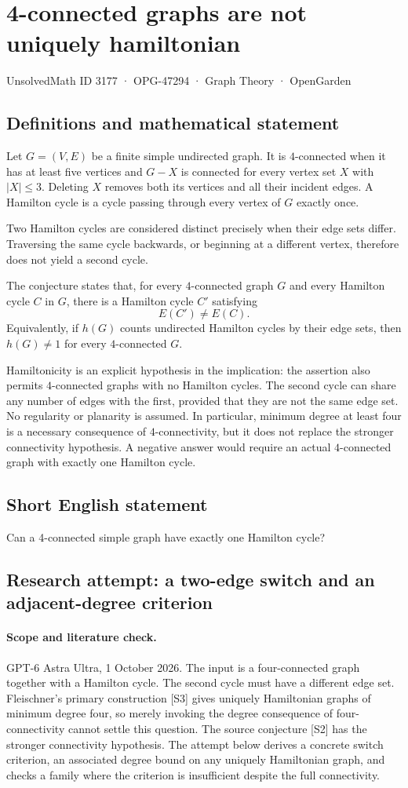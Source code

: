 \documentclass[11pt,a4paper]{article}
\begin{document}
\section*{4-connected graphs are not uniquely hamiltonian}\label{3177}
{\small UnsolvedMath ID 3177 · OPG-47294 · Graph Theory · OpenGarden}
\subsection{Definitions and mathematical statement}
Let $G=(V,E)$ be a finite simple undirected graph.
It is $4$-connected when it has at least five vertices
and $G-X$ is connected for every vertex set $X$ with
$|X|\leq3$. Deleting $X$ removes both its vertices and
all their incident edges. A Hamilton cycle is a cycle
passing through every vertex of $G$ exactly once.

Two Hamilton cycles are considered distinct precisely
when their edge sets differ. Traversing the same cycle
backwards, or beginning at a different vertex, therefore
does not yield a second cycle.

The conjecture states that, for every $4$-connected graph
$G$ and every Hamilton cycle $C$ in $G$, there is a
Hamilton cycle $C'$ satisfying
\[
 E(C')\neq E(C).
\]
Equivalently, if $h(G)$ counts undirected Hamilton cycles
by their edge sets, then $h(G)\neq1$ for every
$4$-connected $G$.

Hamiltonicity is an explicit hypothesis in the implication:
the assertion also permits $4$-connected graphs with no
Hamilton cycles. The second cycle can share any number
of edges with the first, provided that they are not the
same edge set. No regularity or planarity is assumed.
In particular, minimum degree at least four is a necessary
consequence of $4$-connectivity, but it does not replace
the stronger connectivity hypothesis. A negative answer
would require an actual $4$-connected graph with exactly
one Hamilton cycle.
\subsection{Short English statement}
Can a 4-connected simple graph have exactly one Hamilton cycle?
\subsection{Research attempt: a two-edge switch and an adjacent-degree criterion}
\paragraph{Scope and literature check.}
GPT-6 Astra Ultra, 1 October 2026. The input is a four-connected
graph together with a Hamilton cycle. The second cycle must have
a different edge set. Fleischner's primary construction [S3] gives
uniquely Hamiltonian graphs of minimum degree four, so merely invoking
the degree consequence of four-connectivity cannot settle this question.
The source conjecture [S2] has the stronger connectivity hypothesis.
The attempt below derives a concrete switch criterion, an associated
degree bound on any uniquely Hamiltonian graph, and checks a family
where the criterion is insufficient despite the full connectivity.
\end{document}
